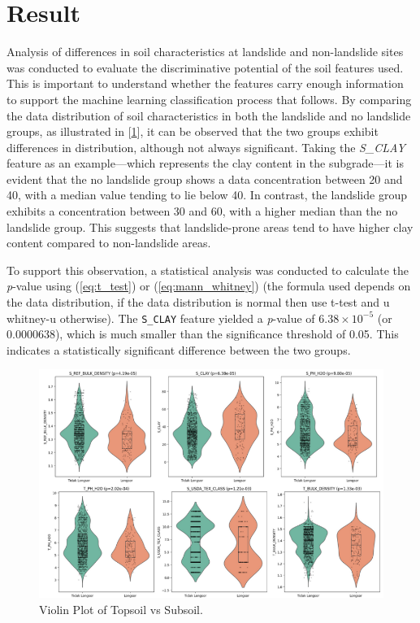 \section{Result}
Analysis of differences in soil characteristics at landslide and non-landslide sites was conducted to evaluate the discriminative potential of the soil features used. This is important to understand whether the features carry enough information to support the machine learning classification process that follows. By comparing the data distribution of soil characteristics in both the landslide and no landslide groups, as illustrated in [\ref{fig:Violin-plot}], it can be observed that the two groups exhibit differences in distribution, although not always significant. Taking the \textit{S\_CLAY} feature as an example—which represents the clay content in the subgrade—it is evident that the no landslide group shows a data concentration between 20 and 40, with a median value tending to lie below 40. In contrast, the landslide group exhibits a concentration between 30 and 60, with a higher median than the no landslide group. This suggests that landslide-prone areas tend to have higher clay content compared to non-landslide areas.

To support this observation, a statistical analysis was conducted to calculate the \textit{p}-value using (\ref{eq:t_test}) or (\ref{eq:mann_whitney}) (the formula used depends on the data distribution, if the data distribution is normal then use t-test and u whitney-u otherwise). The \texttt{S\_CLAY} feature yielded a \textit{p}-value of $6.38 \times 10^{-5}$ (or 0.0000638), which is much smaller than the significance threshold of 0.05. This indicates a statistically significant difference between the two groups.

\begin{figure}[htbp]
    \centerline{\includegraphics[width=\linewidth]{fig6.png}}
    \caption{Violin Plot of Topsoil vs Subsoil.}
    \label{fig:Violin-plot}
\end{figure}


